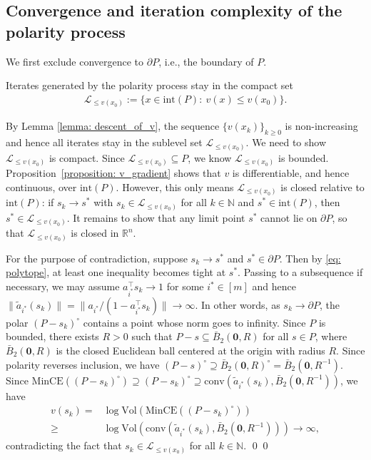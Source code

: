 \documentclass[smallextended]{svjour3}
\let\springerproof\proof
\let\endspringerproof\endproof
\renewenvironment{proof}{\springerproof}{%
  \ifhmode\qed\else\leavevmode\qed\fi\endspringerproof}
\newcommand{\V}{{\mathrm{Vol}}}
\newcommand{\N}{\mathbb{N}}
\newcommand{\R}{\mathbb{R}}
\begin{document}
\subsection{Convergence and iteration complexity of the polarity process}
We first exclude convergence to $\partial P$, i.e., the boundary of $P$.
\begin{lemma}\label{lemma: bounded_iterates}
    Iterates generated by the polarity process stay in the compact set
    \begin{align*}
        \mathcal{L}_{\leq v(x_0)} := \{x \in \mathrm{int}(P):~ v(x) \leq v(x_0)\}.
    \end{align*}
\end{lemma}
\begin{proof}
    By Lemma \ref{lemma: descent_of_v}, the sequence $\{v(x_k)\}_{k\geq0}$ is non-increasing and hence all iterates stay in the sublevel set $\mathcal{L}_{\leq v(x_0)}$. 
    We need to show $\mathcal{L}_{\leq v(x_0)}$ is compact. Since $\mathcal{L}_{\leq v(x_0)}\subseteq P$, we know $\mathcal{L}_{\leq v(x_0)}$ is bounded. 
    Proposition~\ref{proposition: v_gradient} shows that $v$ is differentiable,
    and hence continuous, over $\mathrm{int}(P)$.
    However, this only means $\mathcal{L}_{\leq v(x_0)}$ is closed relative to $\mathrm{int}(P)$: if $s_k \rightarrow s^*$ with $s_k \in \mathcal{L}_{\leq v(x_0)}$ 
    for all $k\in \N$ and $s^* \in \mathrm{int}(P)$, then $s^* \in \mathcal{L}_{\leq v(x_0)}$. It remains to show that any limit point $s^*$ cannot lie on $\partial P$, 
    so that $\mathcal{L}_{\leq v(x_0)}$ is closed in $\R^n$.

    For the purpose of contradiction, suppose $s_k\rightarrow s^*$ and $s^*\in \partial P$. Then by \eqref{eq: polytope}, at least one inequality becomes tight at $s^*$. Passing to a subsequence if necessary, we may assume  $a_{i^*}^\top s_k \rightarrow 1$ for some $i^*\in [m]$ and hence
    $\|\tilde{a}_{i^*}(s_k)\| =\|a_{i^*}/(1-a_{i^*}^\top s_k)\|\rightarrow\infty.$
    In other words, as $s_k\rightarrow \partial P$, the polar $(P-s_k)^\circ$ contains a point whose norm goes to infinity. Since $P$ is bounded, there exists $R>0$ such that $P-s \subseteq \bar{B}_2(\mathbf{0}, R)$ for all $s\in P$, where $\bar{B}_2(\mathbf{0}, R)$ is the closed Euclidean ball centered at the origin with radius $R$. Since polarity reverses inclusion, we have
    $(P-s)^\circ \supseteq \bar{B}_2(\mathbf{0},R)^\circ = \bar{B}_2(\mathbf{0},R^{-1}).$ Since $\mathrm{MinCE}((P-s_k)^\circ) \supseteq (P-s_k)^\circ \supseteq \mathrm{conv}(\tilde{a}_{i^*}(s_k), \bar{B}_2(\mathbf{0}, R^{-1}))$, we have
    \begin{align*}
         v(s_k) = &\log \V (\mathrm{MinCE}((P-s_k)^\circ)) \\
        \geq & \log \V (\mathrm{conv}(\tilde{a}_{i^*}(s_k), \bar{B}_2(\mathbf{0},R^{-1}))) \rightarrow \infty,
    \end{align*}
    contradicting the fact that $s_k \in \mathcal{L}_{\leq v(x_0)}$ for all $k\in \N$.
\end{proof}
\end{document}
